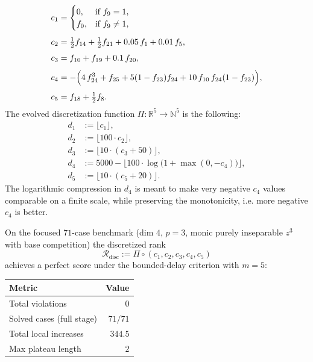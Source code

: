 \documentclass[11pt]{amsart}
\begin{document}

\[
\begin{aligned}
c_1 &=
\begin{cases}
0, & \text{if } f_9=1,\\
f_0, & \text{if } f_9\neq 1,
\end{cases}
\\[4pt]
c_2 &= \tfrac12 f_{14}+\tfrac12 f_{21}+0.05\,f_1+0.01\,f_5,\\[4pt]
c_3 &= f_{10}+f_{19}+0.1\,f_{20},\\[4pt]
c_4 &=-\Bigl(4\,f_{24}^3+f_{25}+5(1-f_{23})f_{24}+10\,f_{10}\,f_{24}(1-f_{23})\Bigr),\\[4pt]
c_5 &= f_{18}+\tfrac12 f_8.
\end{aligned}
\]
The evolved discretization function 
$\Pi\colon \mathbb R^5\to\mathbb N^5$ is the following:
\begin{align*}
d_1 &:= \lfloor c_1\rfloor,\\
d_2 &:= \lfloor 100\cdot c_2\rfloor,\\
d_3 &:= \lfloor 10\cdot (c_3+50)\rfloor,\\
d_4 &:= 5000-\Big\lfloor 100\cdot \log\bigl(1+\max(0,-c_4)\bigr)\Big\rfloor,\\
d_5 &:= \lfloor 10\cdot (c_5+20)\rfloor.
\end{align*}
The logarithmic compression in $d_4$ is meant to make very negative $c_4$ values comparable on a
finite scale, while preserving the monotonicity, i.e. more negative $c_4$ is better.

On the focused $71$-case benchmark (dim $4$, $p=3$, monic purely inseparable $z^3$ with base
competition) the discretized rank
\[
\mathcal R_{\mathrm{disc}} := \Pi\circ (c_1,c_2,c_3,c_4,c_5)
\]
achieves a perfect score under the bounded-delay criterion with $m=5$:
\begin{center}
\begin{tabular}{@{}lr@{}}
\toprule
Metric & Value \\
\midrule
Total violations  & $0$ \\
Solved cases (full stage) & $71/71$ \\
Total local increases & $344.5$ \\
Max plateau length & $2$ \\
\bottomrule
\end{tabular}
\end{center}
\end{document}
